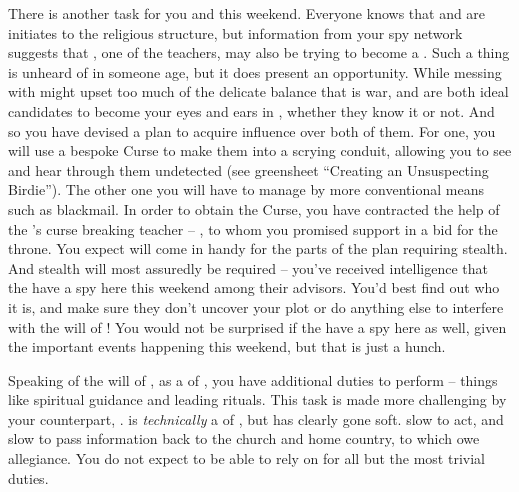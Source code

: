 \documentclass[char]{GL2020}
\begin{document}
There is another task for you and \cScholarship{} this weekend. Everyone knows that \cInitiate{\full} and \cWarlordDaughter{\full} are initiates to the \pShip{} religious structure, but information from your spy network suggests that \cPirate{\full}, one of the teachers, may also be trying to become a \cPirate{\cleric}. Such a thing is unheard of in someone \cPirate{\their} age, but it does present an opportunity. While messing with \cWarlordDaughter{} might upset too much of the delicate balance that is war, \cInitiate{} and \cPirate{} are both ideal candidates to become your eyes and ears in \pShip{}, whether they know it or not. And so you have devised a plan to acquire influence over both of them. For one, you will use a bespoke Curse to make them into a scrying conduit, allowing you to see and hear through them undetected (see greensheet ``Creating an Unsuspecting Birdie''). The other one you will have to manage by more conventional means such as blackmail. In order to obtain the Curse, you have contracted the help of the \pSc{}'s curse breaking teacher -- \cPrince{\full}, to whom you promised support in a bid for the throne. You expect \cScholarship{} will come in handy for the parts of the plan requiring stealth. And stealth will most assuredly be required – you've received intelligence that the \pShip{} have a spy here this weekend among their advisors. You'd best find out who it is, and make sure they don't uncover your plot or do anything else to interfere with the will of \cTechGod{}! You would not be surprised if the \pFarm{} have a spy here as well, given the important events happening this weekend, but that is just a hunch.

Speaking of the will of \cTechGod{}, as a \cAntiChup{\cleric} of \cTechGod{}, you have additional duties to perform -- things like spiritual guidance and leading rituals. This task is made more challenging by your counterpart, \cBeetle{\full}. \cBeetle{} is \emph{technically} a \cBeetle{\cleric} of \cTechGod{}, but has clearly gone soft. \cBeetle{\Theyare} slow to act, and slow to pass information back to the church and \cBeetle{\their} home country, to which \cBeetle{\they} owe\cBeetle{\plural} allegiance. You do not expect to be able to rely on \cBeetle{} for all but the most trivial duties.
\end{document}
